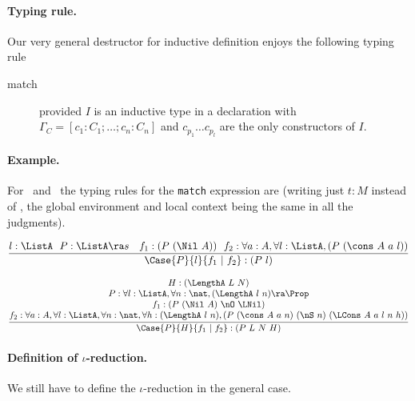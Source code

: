 \paragraph{Typing rule.}

Our very general destructor for inductive definition enjoys the
following typing rule

\begin{description}
\item[match] \label{elimdep} 

provided $I$ is an inductive type in a declaration
 with 
$\Gamma_C = [c_1:C_1;\ldots;c_n:C_n]$ and $c_{p_1}\ldots  c_{p_l}$ are the
only constructors of $I$.
\end{description}

\paragraph{Example.}
For \List\ and \Length\ the typing rules for the {\tt match} expression
are (writing just $t:M$ instead of , the global environment and
local context being the same in all the judgments).

\[\frac{l:\ListA~~P:\ListA\ra s~~~f_1:(P~(\Nil~A))~~
      f_2:\forall a:A, \forall l:\ListA, (P~(\cons~A~a~l))}
    {\Case{P}{l}{f_1~|~f_2}:(P~l)}\]

\[\frac{
     \begin{array}[b]{@{}c@{}} 
H:(\LengthA~L~N) \\ P:\forall l:\ListA, \forall n:\nat, (\LengthA~l~n)\ra
  \Prop\\
 f_1:(P~(\Nil~A)~\nO~\LNil) \\
   f_2:\forall a:A, \forall l:\ListA, \forall n:\nat, \forall
  h:(\LengthA~l~n), (P~(\cons~A~a~n)~(\nS~n)~(\LCons~A~a~l~n~h)) 
      \end{array}}
    {\Case{P}{H}{f_1~|~f_2}:(P~L~N~H)}\]

\paragraph[Definition of $\iota$-reduction.]{Definition of $\iota$-reduction.\label{iotared}
}
We still have to define the $\iota$-reduction in the general case.

